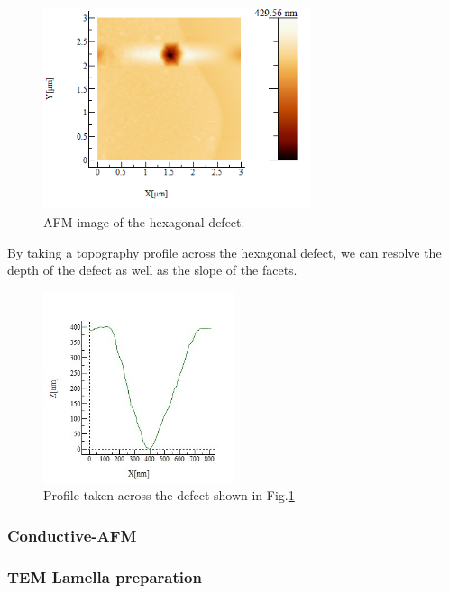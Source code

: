 \begin{figure}[!ht]
	\centering
	\includegraphics[width=0.7\textwidth]{Figs/Ch3/AFM.png}
	\caption[h] {AFM image of the hexagonal defect.}
	\label{afm-pit}
\end{figure}
\FloatBarrier 

By taking a topography profile across the hexagonal defect, we can resolve the depth of the defect as well as the slope of the facets.

\begin{figure}[!ht]
	\centering
	\includegraphics[width=0.5\textwidth]{Figs/Ch3/profile}
	\caption[h] {Profile taken across the defect shown in Fig.\ref{afm-pit}}
	\label{profile}
\end{figure}
\FloatBarrier 



\subsubsection{Conductive-AFM}

\subsubsection{TEM Lamella preparation}

